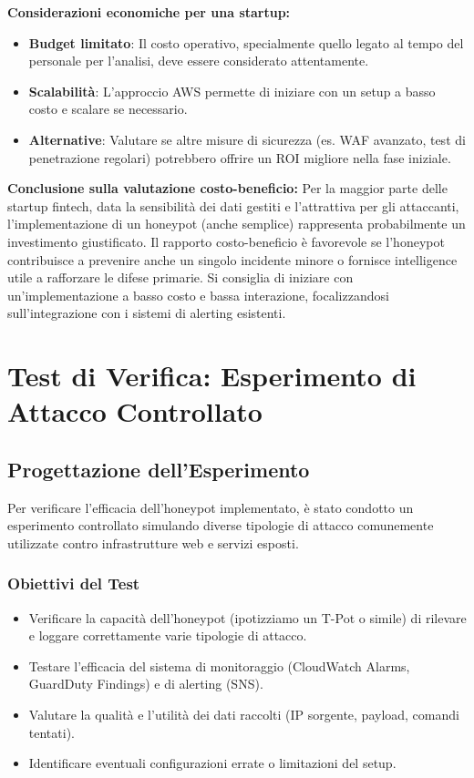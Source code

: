 \textbf{Considerazioni economiche per una startup:}
\begin{itemize}
    \item \textbf{Budget limitato}: Il costo operativo, specialmente quello legato al tempo del personale per l'analisi, deve essere considerato attentamente.
    \item \textbf{Scalabilità}: L'approccio AWS permette di iniziare con un setup a basso costo e scalare se necessario.
    \item \textbf{Alternative}: Valutare se altre misure di sicurezza (es. WAF avanzato, test di penetrazione regolari) potrebbero offrire un ROI migliore nella fase iniziale.
\end{itemize}

\textbf{Conclusione sulla valutazione costo-beneficio:}
Per la maggior parte delle startup fintech, data la sensibilità dei dati gestiti e l'attrattiva per gli attaccanti, l'implementazione di un honeypot (anche semplice) rappresenta probabilmente un investimento giustificato. Il rapporto costo-beneficio è favorevole se l'honeypot contribuisce a prevenire anche un singolo incidente minore o fornisce intelligence utile a rafforzare le difese primarie. Si consiglia di iniziare con un'implementazione a basso costo e bassa interazione, focalizzandosi sull'integrazione con i sistemi di alerting esistenti.

\section{Test di Verifica: Esperimento di Attacco Controllato}
\label{sec:test_verifica}

\subsection{Progettazione dell'Esperimento}
\label{subsec:progettazione_test}

Per verificare l'efficacia dell'honeypot implementato, è stato condotto un esperimento controllato simulando diverse tipologie di attacco comunemente utilizzate contro infrastrutture web e servizi esposti.

\subsubsection{Obiettivi del Test}
\label{subsubsec:obiettivi_test}
\begin{itemize}
    \item Verificare la capacità dell'honeypot (ipotizziamo un T-Pot o simile) di rilevare e loggare correttamente varie tipologie di attacco.
    \item Testare l'efficacia del sistema di monitoraggio (CloudWatch Alarms, GuardDuty Findings) e di alerting (SNS).
    \item Valutare la qualità e l'utilità dei dati raccolti (IP sorgente, payload, comandi tentati).
    \item Identificare eventuali configurazioni errate o limitazioni del setup.
\end{itemize}

